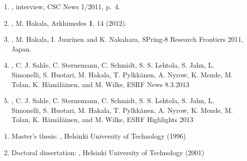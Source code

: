 \documentclass[12pt,a4]{report}
\begin{document}
\begin{enumerate}
\item {}, interview, CSC News 1/2011, p.~4. 

\item {}, M. Hakala, Arkhimedes {\bf 1}, 14 (2012).

\item {}, M. Hakala, I. Juurinen and K. Nakahara, SPring-8 Research Frontiers 2011, Japan.

\item {}, C. J. Sahle, C. Sternemann, C. Schmidt, S. S. Lehtola, S. Jahn, L. Simonelli, S. Huotari, M. Hakala, T. Pylkk{\"a}nen, A. Nyrow, K. Mende, M. Tolan, K. H{\"a}m{\"a}l{\"a}inen, and M. Wilke, ESRF News 8.3.2013

\item {}, C. J. Sahle, C. Sternemann, C. Schmidt, S. S. Lehtola, S. Jahn, L. Simonelli, S. Huotari, M. Hakala, T. Pylkk{\"a}nen, A. Nyrow, K. Mende, M. Tolan, K. H{\"a}m{\"a}l{\"a}inen, and M. Wilke, ESRF Highlights 2013

\end{enumerate}







\begin{enumerate}

\item Master's thesis: , Hel\-sin\-ki University of Technology (1996)

\item Doctoral dissertation: , Helsinki University of Technology (2001) 


\end{enumerate}

\end{document}
